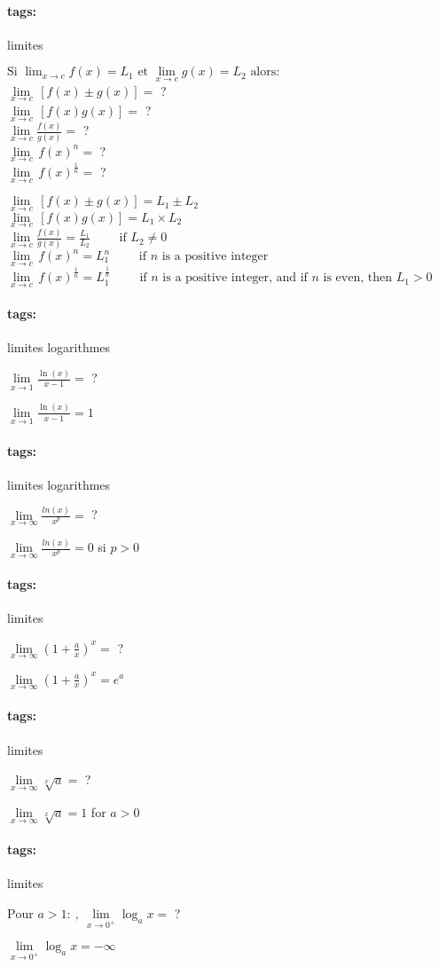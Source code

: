 \documentclass[12pt]{article}
\newcommand*{\xfield}[1]{\begin{mdframed}\centering #1\end{mdframed}\bigskip}
\newenvironment{note}{}{}
\newcommand*{\tags}[1]{\paragraph{tags: }#1}
\begin{document}
\begin{note}
	\tags{limites}
    \xfield{$\text{Si }\lim_{x \to c} f(x) = L_1 \text{ et }\lim\limits_{x \to c} g(x) = L_2 \text{ alors:}$ \\ $\lim\limits_{x \to c} \, [f(x) \pm g(x)] = $ ? \\$\lim\limits_{x \to c} \, [f(x)g(x)] =$ ? \\ $\lim\limits_{x \to c} \frac{f(x)}{g(x)} =$ ?\\ $\lim\limits_{x \to c} \, f(x)^n =$ ?\\ $\lim\limits_{x \to c} \, f(x)^\frac {1} {n} =$ ?}
    \xfield{$\lim\limits_{x \to c} \, [f(x) \pm g(x)] = L_1 \pm L_2$\\$\lim\limits_{x \to c} \, [f(x)g(x)] = L_1 \times L_2$ \\ $\lim\limits_{x \to c} \frac{f(x)}{g(x)} = \frac{L_1}{L_2} \qquad \text{ if } L_2 \ne 0$ \\ $\lim\limits_{x \to c} \, f(x)^n = L_1^n \qquad \text{ if }n \text{ is a positive integer}$ \\ $\lim\limits_{x \to c} \, f(x)^\frac {1} {n} = L_1^\frac {1}{n} \qquad \text{ if }n \text{ is a positive integer, and if } n \text{ is even, then } L_1 > 0$}
\end{note}

\begin{note}
	\tags{limites logarithmes}
	\xfield{$\lim\limits_{x\to1}\frac{\ln(x)}{x-1}=$ ?}
	\xfield{$\lim\limits_{x\to1}\frac{\ln(x)}{x-1}=1$}
\end{note}

\begin{note}
	\tags{limites logarithmes}
	\xfield{$\lim\limits_{x\to \infty} \frac{ln(x)}{x^p}= $ ?}
	\xfield{$\lim\limits_{x\to \infty} \frac{ln(x)}{x^p}= 0$ si $p>0$}
\end{note}

\begin{note}
	\tags{limites}
	\xfield{$\lim\limits_{x \to \infty}(1+\frac{a}{x})^x = $ ?}
	\xfield{$\lim\limits_{x \to \infty}(1+\frac{a}{x})^x = e^a$}
\end{note}


\begin{note}
	\tags{limites}
	\xfield{$\lim\limits_{x \to \infty} \sqrt[x]{a} =$ ?}
	\xfield{$\lim\limits_{x \to \infty} \sqrt[x]{a} = 1$ for $a > 0$}
\end{note}

\begin{note}
	\tags{limites}
	\xfield{$\mbox{Pour } a > 1:\ ,\ \lim\limits_{x \to 0^+} \log_a x = $ ?}
	\xfield{$\lim\limits_{x \to 0^+} \log_a x = -\infty$}
\end{note}
\end{document}
